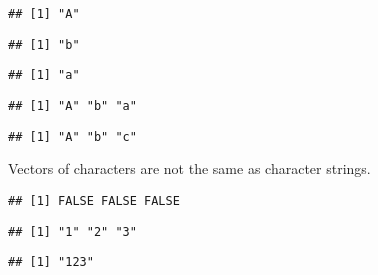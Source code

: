 \documentclass[paper=a4,10pt,div=17,headsepline,BCOR=12mm,twoside,open=right]{scrbook}\usepackage{knitr}
\begin{document}
\begin{knitrout}\footnotesize
{}\color{fgcolor}\begin{kframe}
\begin{alltt}
 \hlkwb{<-} 
 \hlkwb{<-} \hlstd{letters[}\hlstd{]}
 \hlkwb{<-} \hlstd{letters[}\hlstd{]}
\end{alltt}
\begin{verbatim}
## [1] "A"
\end{verbatim}
\begin{alltt}
\end{alltt}
\begin{verbatim}
## [1] "b"
\end{verbatim}
\begin{alltt}
\end{alltt}
\begin{verbatim}
## [1] "a"
\end{verbatim}
\begin{alltt}
 \hlkwb{<-} 
\end{alltt}
\begin{verbatim}
## [1] "A" "b" "a"
\end{verbatim}
\begin{alltt}
 \hlkwb{<-}  \hlstd{)}
\end{alltt}
\begin{verbatim}
## [1] "A" "b" "c"
\end{verbatim}
\begin{alltt}
 \hlkwb{<-} 
 \hlopt{+} \hlstd{)}
\end{alltt}
\end{kframe}
\end{knitrout}

Vectors of characters are not the same as character strings.

\begin{knitrout}\footnotesize
{}\color{fgcolor}\begin{kframe}
\begin{alltt}
 \hlkwb{<-} \hlstd{(}\hlstd{,} \hlstd{,} \hlstd{)}
 \hlkwb{<-} 
 \hlopt{==} 
\end{alltt}
\begin{verbatim}
## [1] FALSE FALSE FALSE
\end{verbatim}
\begin{alltt}
\end{alltt}
\begin{verbatim}
## [1] "1" "2" "3"
\end{verbatim}
\begin{alltt}
\end{alltt}
\begin{verbatim}
## [1] "123"
\end{verbatim}
\end{kframe}
\end{knitrout}
\end{document}
